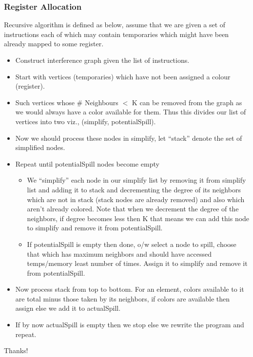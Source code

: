 \documentclass{beamer}
\begin{document}
\begin{framefont}{\tiny}
  \begin{frame}
    \frametitle{Register Allocation}
    Recursive algorithm is defined as below, assume that we are given a set of instructions each of which may contain temporaries which might have been already mapped to some register.
    \begin{itemize}
    \item
      Construct interference graph given the list of instructions.
    \item
      Start with vertices (temporaries) which have not been assigned a
      colour (register).
    \item
      Such vertices whose \# Neighbours \(<\) K can be removed from the
      graph as we would always have a color available for them. Thus this
      divides our list of vertices into two viz., (simplify,
      potentialSpill).
    \item
      Now we should process these nodes in simplify, let ``stack'' denote
      the set of simplified nodes.
    \item
      Repeat until potentialSpill nodes become empty
      \begin{itemize}
      \item
        We ``simplify'' each node in our simplify list by removing it from
        simplify list and adding it to stack and decrementing the degree of
        its neighbors which are not in stack (stack nodes are already
        removed) and also which aren't already colored. Note that when we
        decrement the degree of the neighbors, if degree becomes less then K
        that means we can add this node to simplify and remove it from
        potentialSpill.
      \item
        If potentialSpill is empty then done, o/w select a node to spill,
        choose that which has maximum neighbors and should have accessed
        temps/memory least number of times. Assign it to simplify and remove
        it from potentialSpill.
      \end{itemize}
    \item
      Now process stack from top to bottom. For an element, colors available
      to it are total minus those taken by its neighbors, if colors are
      available then assign else we add it to actualSpill.
    \item
      If by now actualSpill is empty then we stop else we rewrite the
      program and repeat.
    \end{itemize}
  \end{frame}
\end{framefont}
\begin{frame}[standout]
Thanks!
\end{frame}   
\end{document}
